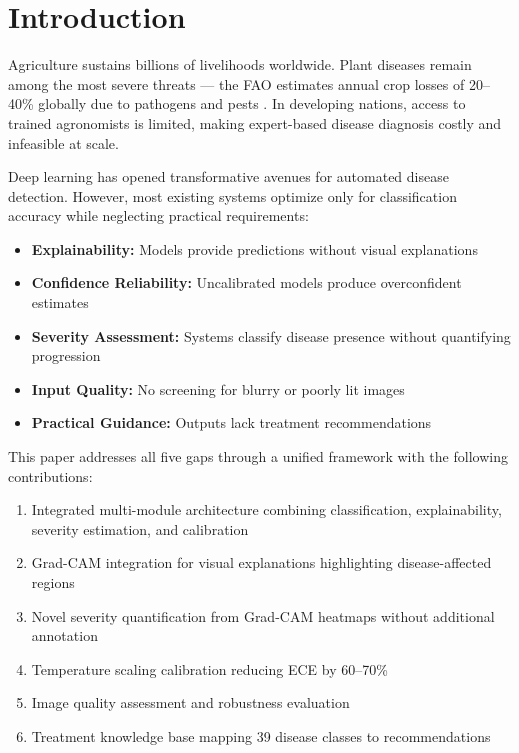 \documentclass[conference]{IEEEtran}
\begin{document}
\section{Introduction}

Agriculture sustains billions of livelihoods worldwide. Plant diseases remain among the most severe threats --- the FAO estimates annual crop losses of 20--40\% globally due to pathogens and pests \cite{fao2021}. In developing nations, access to trained agronomists is limited, making expert-based disease diagnosis costly and infeasible at scale.

Deep learning has opened transformative avenues for automated disease detection. However, most existing systems optimize only for classification accuracy while neglecting practical requirements:

\begin{itemize}
  \item \textbf{Explainability:} Models provide predictions without visual explanations
  \item \textbf{Confidence Reliability:} Uncalibrated models produce overconfident estimates
  \item \textbf{Severity Assessment:} Systems classify disease presence without quantifying progression
  \item \textbf{Input Quality:} No screening for blurry or poorly lit images
  \item \textbf{Practical Guidance:} Outputs lack treatment recommendations
\end{itemize}

This paper addresses all five gaps through a unified framework with the following contributions:

\begin{enumerate}
  \item Integrated multi-module architecture combining classification, explainability, severity estimation, and calibration
  \item Grad-CAM integration for visual explanations highlighting disease-affected regions
  \item Novel severity quantification from Grad-CAM heatmaps without additional annotation
  \item Temperature scaling calibration reducing ECE by 60--70\%
  \item Image quality assessment and robustness evaluation
  \item Treatment knowledge base mapping 39 disease classes to recommendations
\end{enumerate}
\end{document}
